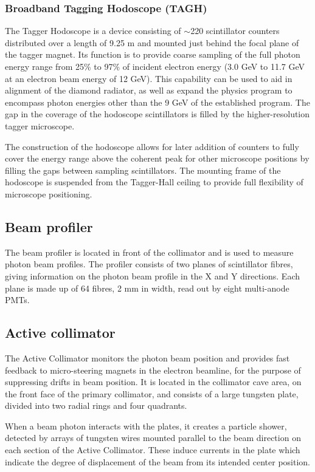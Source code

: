 \subsubsection{Broadband Tagging Hodoscope (TAGH)}\label{sec:TAGHIntro}
The Tagger Hodoscope is a device consisting of $\sim$220 scintillator counters distributed over a length of 9.25 m and mounted just behind the focal plane of the tagger magnet.
Its function is to provide coarse sampling of the full photon energy range from 25\% to 97\% of incident electron energy (3.0 GeV to 11.7 GeV at an electron beam energy of 12 GeV).
This capability can be used to aid in alignment of the diamond radiator, as well as expand the \GX{} physics program to encompass photon energies other than the 9 GeV of the established program.
The gap in the coverage of the hodoscope scintillators is filled by the higher-resolution tagger microscope.

The construction of the hodoscope allows for later addition of counters to fully cover the energy range above the coherent peak for other microscope positions by filling the gaps between sampling scintillators. The mounting frame of the hodoscope is suspended from the Tagger-Hall ceiling to provide full flexibility of microscope positioning.

\subsection{Beam profiler}
The beam profiler is located in front of the collimator and is used to measure photon beam profiles.
The profiler consists of two planes of scintillator fibres, giving information on the photon beam profile in the X and Y directions.
Each plane is made up of 64 fibres, 2 mm in width, read out by eight multi-anode PMTs.

\subsection{Active collimator \label{sec:coll}}
The Active Collimator monitors the photon beam position and provides fast feedback to micro-steering magnets in the electron beamline, for the purpose of suppressing drifts in beam position.
It is located in the collimator cave area, on the front face of the primary collimator, and consists of a large tungsten plate, divided into two radial rings and four quadrants.

When a beam photon interacts with the plates, it creates a particle shower, detected by arrays of tungsten wires mounted parallel to the beam direction on each section of the Active Collimator.
These induce currents in the plate which indicate the degree of displacement of the beam from its intended center position.

